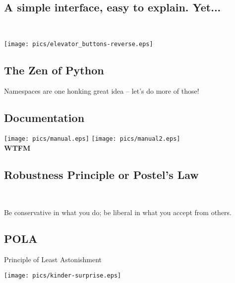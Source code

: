 \documentclass[xga]{xdvislides}
\begin{document}
\subsection{A simple interface, easy to explain.  Yet...}
\\
\vspace*{\fill}
\begin{center}
	\texttt{[image: pics/elevator\_buttons-reverse.eps]}
\end{center}
\vspace*{\fill}


\subsection{The Zen of Python}
\begin{center}
    Namespaces are one honking great idea -- let's do more of those!
\end{center}
\Normalsize

\subsection{Documentation}
\vspace*{\fill}
\begin{center}
	\texttt{[image: pics/manual.eps]}
	\hspace{.5in}
	\texttt{[image: pics/manual2.eps]}
	\\
	\vspace{.2in}
	\Huge
	{\bf WTFM}
	\Normalsize
\end{center}
\vspace*{\fill}

\subsection{Robustness Principle or Postel's Law}
\\
\Huge
\begin{center}
	Be conservative in what you do; be liberal in what you accept from others.
\end{center}
\Normalsize


\subsection{POLA}
Principle of Least Astonishment
\\
\vspace*{\fill}
\begin{center}
	\texttt{[image: pics/kinder-surprise.eps]}
\end{center}
\vspace*{\fill}
\end{document}
